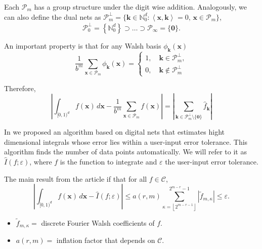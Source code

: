\documentclass[]{elsarticle}
\theoremstyle{definition}
\newcommand{\cube}{[0,1)^d}
\newcommand{\bvec}[1]{\boldsymbol{#1}}
\newcommand{\vx}{\bvec{x}}
\newcommand{\vk}{\bvec{k}}
\newcommand{\hf}{\hat{f}}
\newcommand{\tf}{\tilde{f}}
\newcommand{\vzero}{\bvec{0}}
\newcommand{\ip}[3][{}]{\ensuremath{\left \langle #2, #3 \right \rangle_{#1}}}
\def\abs#1{\ensuremath{\left \lvert #1 \right \rvert}}
\begin{document}
Each $\mathcal{P}_m$ has a group structure under the digit wise addition. Analogously, we can also define the dual nets as $\mathcal{P}_m^\perp=\{\vk\in\mathbb{N}_0^d:\ip{\vx}{\vk}=0,\, \vx\in\mathcal{P}_m\}$,
\[
\mathcal{P}_0^\perp=\left\{\mathbb{N}_0^d\right\}\supset\dots\supset\mathcal{P}_\infty=\{\bvec{0}\}.
\]

An important property is that for any Walsh basis $\phi_{\vk}(\vx)$
\[
\frac{1}{b^m}\sum_{\vx\in\mathcal{P}_m}\phi_{\vk}(\vx)=
\begin{cases}
1,\quad \vk\in\mathcal{P}_m^\perp, \\
0,\quad \vk\notin\mathcal{P}_m^\perp
\end{cases}
\]

Therefore,
\[
\abs{\int_{\cube} f(\vx)\,d\vx - \frac{1}{b^m}\sum_{\vx\in\mathcal{P}_m}f(\vx)}=\abs{\sum_{\vk\in\mathcal{P}_m^\perp\setminus\{\vzero\}}\hf_{\vk}}
\]

In \cite{HicJim} we proposed an algorithm based on digital nets that estimates hight dimensional integrals whose error lies within a user-input error tolerance. This algorithm finds the number of data points automatically. We will refer to it as $\widehat{I}(f;\varepsilon)$, where $f$ is the function to integrate and $\varepsilon$ the user-input error tolerance.

The main result from the article if that for all $f\in\mathcal{C}$,
\[
\abs{\int_{\cube} f(\vx)\,d\vx - \widehat{I}(f;\varepsilon)}\leq a(r,m)\sum_{\kappa=\left \lfloor 2^{m-r-1}\right \rfloor}^{2^{m-r}-1} \abs{\tf_{m,\kappa}}\leq \varepsilon.
\]
\begin{itemize}
\item $\tf_{m,\kappa}=$ discrete Fourier Walsh coefficients of $f$.
\item $a(r,m)=$ inflation factor that depends on $\mathcal{C}$.
\end{itemize}
\end{document}
